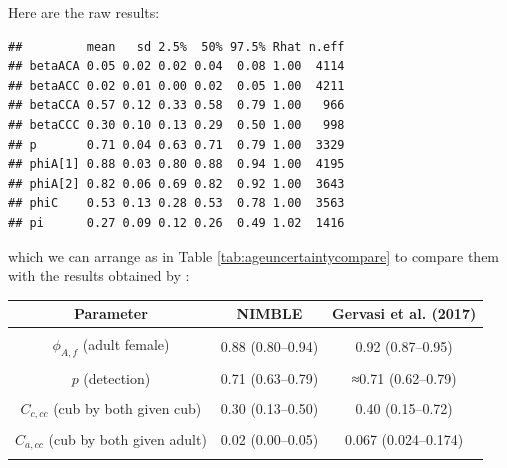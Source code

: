 \documentclass[
  12pt,
]{krantz}
\begin{document}
Here are the raw results:

\begin{verbatim}
##         mean   sd 2.5%  50% 97.5% Rhat n.eff
## betaACA 0.05 0.02 0.02 0.04  0.08 1.00  4114
## betaACC 0.02 0.01 0.00 0.02  0.05 1.00  4211
## betaCCA 0.57 0.12 0.33 0.58  0.79 1.00   966
## betaCCC 0.30 0.10 0.13 0.29  0.50 1.00   998
## p       0.71 0.04 0.63 0.71  0.79 1.00  3329
## phiA[1] 0.88 0.03 0.80 0.88  0.94 1.00  4195
## phiA[2] 0.82 0.06 0.69 0.82  0.92 1.00  3643
## phiC    0.53 0.13 0.28 0.53  0.78 1.00  3563
## pi      0.27 0.09 0.12 0.26  0.49 1.02  1416
\end{verbatim}

which we can arrange as in Table \ref{tab:ageuncertaintycompare} to compare them with the results obtained by \citet{Gervasi2017}:

\begin{table}
\centering
\caption{\label{tab:ageuncertaintycompare}Comparison of parameter estimates for the same HMM to account for age uncertainty: our NIMBLE fit vs. Gervasi et al. (2017, Table 3).}
\centering
\begin{longtable}{ccc}
\toprule
Parameter & NIMBLE & Gervasi et al. (2017)\\
\midrule
\cellcolor{gray!10}{$\phi_C$ (cub survival)} & \cellcolor{gray!10}{0.53 (0.28–0.78)} & \cellcolor{gray!10}{0.51 (0.22–0.79)}\\
$\phi_{A,f}$ (adult female) & 0.88 (0.80–0.94) & 0.92 (0.87–0.95)\\
\cellcolor{gray!10}{$\phi_{A,m}$ (adult male)} & \cellcolor{gray!10}{0.82 (0.69–0.92)} & \cellcolor{gray!10}{0.85 (0.76–0.91)}\\
$p$ (detection) & 0.71 (0.63–0.79) & ≈0.71 (0.62–0.79)\\
\cellcolor{gray!10}{$\pi$ (cub at first detection)} & \cellcolor{gray!10}{0.27 (0.12–0.49)} & \cellcolor{gray!10}{0.062 (0.007–0.396)}\\
\addlinespace
$C_{c,cc}$ (cub by both given cub) & 0.30 (0.13–0.50) & 0.40 (0.15–0.72)\\
\cellcolor{gray!10}{$C_{c,ca}$ (cub by P1 only given cub)} & \cellcolor{gray!10}{0.57 (0.33–0.79)} & \cellcolor{gray!10}{0.60 (0.28–0.85)}\\
$C_{a,cc}$ (cub by both given adult) & 0.02 (0.00–0.05) & 0.067 (0.024–0.174)\\
\cellcolor{gray!10}{$C_{a,ca}$ (cub by P1 only given adult)} & \cellcolor{gray!10}{0.05 (0.02–0.08)} & \cellcolor{gray!10}{0.191 (0.110–0.309)}\\
\bottomrule
\end{longtable}
\end{table}
\end{document}
